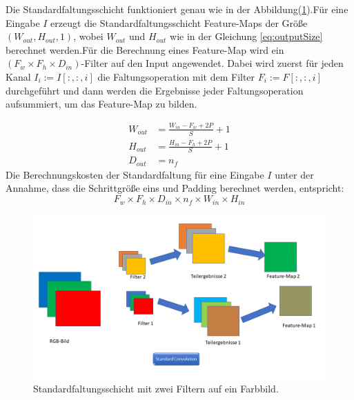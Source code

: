 \documentclass[12pt,a4paper]{scrartcl}
\numberwithin{equation}{section}
\begin{document}
Die Standardfaltungsschicht funktioniert genau wie in der Abbildung(\ref{fig:Standardfaltung}).Für eine Eingabe $ I $ erzeugt die Standardfaltungsschicht Feature-Maps der Größe $(W_{out},H_{out}, 1) $, wobei $W_{out} $ und $H_{out} $ wie in der Gleichung \ref{eq:outputSize} berechnet werden.Für die Berechnung eines Feature-Map wird ein $ (F_w\times F_h\times D_{in}) $-Filter auf den Input angewendet. Dabei wird zuerst für jeden Kanal $ I_i :=I[:,:, i]$ die Faltungsoperation mit dem Filter $ F_i := F[:,:,i] $ durchgeführt und dann werden die Ergebnisse jeder Faltungsoperation aufsummiert, um das Feature-Map zu bilden.

\begin{equation}\label{eq:outputSize}
	 \begin{split}
	W_{out} &= \frac{W_{in}-F_w+2P}{S}+1\\
	H_{out} &= \frac{H_{in}-F_h+2P}{S}+1\\
	D_{out} &= n_f 
	\end{split} 
\end{equation}
Die Berechnungskosten der Standardfaltung für eine Eingabe $ I $ unter der Annahme, dass die Schrittgröße eins und Padding berechnet werden, entspricht:
\begin{equation}\label{eq:SF_kost}
	F_w\times F_h \times D_{in}\times n_f \times W_{in}\times H_{in}
\end{equation}
\begin{figure}[h]
	\includegraphics[width=\textwidth]{Convolution/Folie1}
	\caption{Standardfaltungsschicht mit zwei Filtern auf ein Farbbild.}
	\label{fig:Standardfaltung}
\end{figure}
\end{document}
